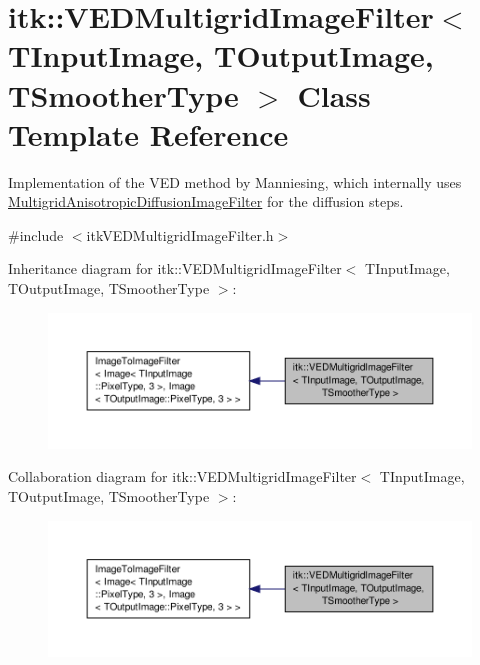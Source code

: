 \hypertarget{classitk_1_1_v_e_d_multigrid_image_filter}{\section{itk\-:\-:V\-E\-D\-Multigrid\-Image\-Filter$<$ T\-Input\-Image, T\-Output\-Image, T\-Smoother\-Type $>$ Class Template Reference}
\label{classitk_1_1_v_e_d_multigrid_image_filter}
}


Implementation of the V\-E\-D method by Manniesing, which internally uses \hyperlink{classitk_1_1_multigrid_anisotropic_diffusion_image_filter}{Multigrid\-Anisotropic\-Diffusion\-Image\-Filter} for the diffusion steps.  




{\ttfamily \#include $<$itk\-V\-E\-D\-Multigrid\-Image\-Filter.\-h$>$}



Inheritance diagram for itk\-:\-:V\-E\-D\-Multigrid\-Image\-Filter$<$ T\-Input\-Image, T\-Output\-Image, T\-Smoother\-Type $>$\-:
\nopagebreak
\begin{figure}[H]
\begin{center}
\leavevmode
\includegraphics[width=350pt]{classitk_1_1_v_e_d_multigrid_image_filter__inherit__graph}
\end{center}
\end{figure}


Collaboration diagram for itk\-:\-:V\-E\-D\-Multigrid\-Image\-Filter$<$ T\-Input\-Image, T\-Output\-Image, T\-Smoother\-Type $>$\-:
\nopagebreak
\begin{figure}[H]
\begin{center}
\leavevmode
\includegraphics[width=350pt]{classitk_1_1_v_e_d_multigrid_image_filter__coll__graph}
\end{center}
\end{figure}
